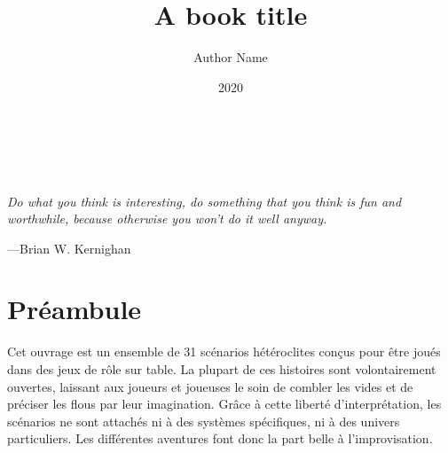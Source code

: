 \documentclass[a5paper,pagesize,10pt,bibliography=totoc,numbers=enddot,
headings=normal,DIV=9,twoside=false,tablecaptionabove]{scrbook}
\title{A book title}
\author{Author Name}
\date{2020}
\begin{document}
\makeatletter
\begin{titlepage}
		\centering{
			{\fontsize{40}{48}\selectfont 
			\@title}
		}\\
			
		\vspace{10mm}
		\centering{\Large{\@author}}\\
		\vspace{\fill}
		\centering \large{\@date}
\end{titlepage}
\makeatother

\newpage{}
\thispagestyle {empty}

\vspace*{2cm}

\begin{center}
	\Large{\parbox{10cm}{
		\begin{raggedright}
		{\Large 
			\textit{Do what you think is interesting, 
			do something that you think is fun and worthwhile, 
			because otherwise you won’t do it well anyway.}
		}
	
		\vspace{.5cm}\hfill{---Brian W. Kernighan}
		\end{raggedright}
	}
}
\end{center}

\newcommand\keywords[3]{%
	\section*{Mots-clés :}

	\textbf{Cadre} : #1

	\textbf{Genre} : #2

	\textbf{Thème} : #3
}%

\newcommand\medfan[1]{%
	\emph{medfan}
}%

\newpage


\chapter*{Préambule}

Cet ouvrage est un ensemble de 31 scénarios hétéroclites conçus pour être joués dans des jeux de rôle sur table.
La plupart de ces histoires sont volontairement ouvertes, laissant aux joueurs et joueuses le soin de combler les vides et de préciser les flous par leur imagination.
Grâce à cette liberté d'interprétation, les scénarios ne sont attachés ni à des systèmes spécifiques, ni à des univers particuliers.
Les différentes aventures font donc la part belle à l'improvisation.
\end{document}
